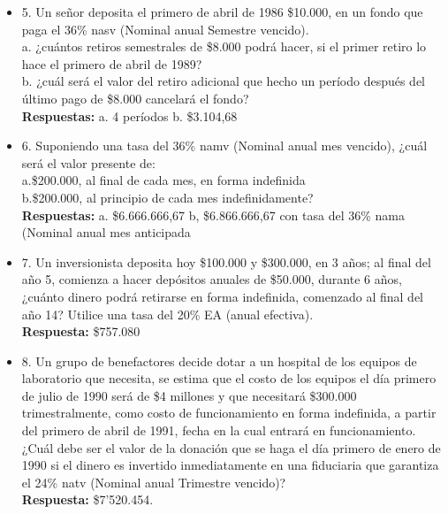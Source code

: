\begin{itemize}
	\item 5. Un señor deposita el primero de abril de 1986 \$10.000, en un fondo que paga el 36\% nasv (Nominal anual Semestre vencido).\\
	      
	      a. ¿cuántos retiros semestrales de \$8.000 podrá hacer, si el primer retiro lo hace el primero de abril de 1989?\\
	      b. ¿cuál será el valor del retiro adicional que hecho un período después del último pago de \$8.000 cancelará el fondo?\\
	      \textbf{Respuestas:} a. 4 períodos \hspace{1,0cm} b. \$3.104,68\\
	      \medskip
	      
	\item 6. Suponiendo una tasa del 36\% namv (Nominal anual mes vencido), ¿cuál será el valor presente de:\\
	      
	      a.\$200.000, al final de cada mes, en forma indefinida\\
	      b.\$200.000, al principio de cada mes indefinidamente?\\
	      \textbf{Respuestas:} a. \$6.666.666,67 \hspace{0,5 cm}b, \$6.866.666,67 con tasa del 36\% nama (Nominal anual mes anticipada\\
	      \medskip
	      
	\item 7. Un inversionista deposita hoy \$100.000 y \$300.000, en 3 años; al final del año 5, comienza a hacer depósitos anuales de \$50.000, durante 6 años, ¿cuánto dinero podrá retirarse en forma indefinida, comenzado al final del año 14? Utilice una tasa del 20\% EA (anual efectiva).\\
	      \textbf{Respuesta:} \$757.080\\
	      \medskip
	      
	\item 8. Un grupo de benefactores decide dotar a un hospital de los equipos de laboratorio que necesita, se estima que el costo de los equipos el día primero de julio de 1990 será de \$4 millones y que necesitará \$300.000 trimestralmente, como costo de funcionamiento en forma indefinida, a partir del primero de abril de 1991, fecha en la cual entrará en funcionamiento. ¿Cuál debe ser el valor de la donación que se haga el día primero de enero de 1990 si el dinero es invertido inmediatamente en una fiduciaria que garantiza el 24\%  natv (Nominal anual Trimestre vencido)?\\
	      \textbf{Respuesta:} \$7'520.454.\\
	      \medskip
	      

\end{itemize}
